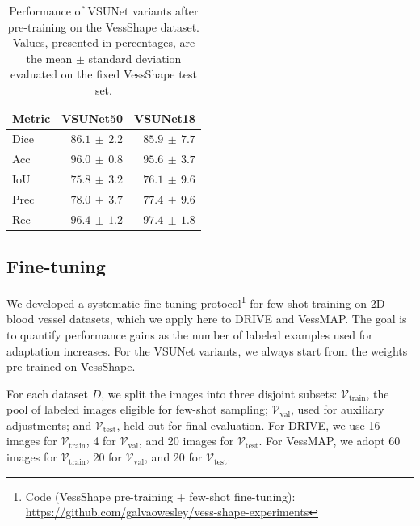 \documentclass[%
reprint,
nofootinbib,
 amsmath,amssymb,
aps,
superscriptaddress,
showkeys,
longbibliography
]{revtex4-1}
\begin{document}
\begin{table}[t]
    \caption{Performance of VSUNet variants after pre-training on the VessShape dataset. Values, presented in percentages, are the mean $\pm$ standard deviation evaluated on the fixed VessShape test set.}
    \label{tab:vessshape_results_percent}
    \centering
    \begingroup
    \small
    \setlength{\tabcolsep}{6pt}
    \renewcommand{\arraystretch}{1.15}
    \begin{tabular}{l r r}
        \hline
        	\textbf{Metric} & \textbf{VSUNet50} & \textbf{VSUNet18} \\
        \hline
        Dice & $86.1 \,\pm\, 2.2$ & $85.9 \,\pm\, 7.7$ \\
        Acc & $96.0 \,\pm\, 0.8$ & $95.6 \,\pm\, 3.7$ \\
        IoU & $75.8 \,\pm\, 3.2$ & $76.1 \,\pm\, 9.6$ \\
        Prec & $78.0 \,\pm\, 3.7$ & $77.4 \,\pm\, 9.6$ \\
        Rec & $96.4 \,\pm\, 1.2$ & $97.4 \,\pm\, 1.8$ \\
        \hline
    \end{tabular}
    \endgroup
\end{table}



\subsection{Fine-tuning}

We developed a systematic fine-tuning protocol\footnote{Code (VessShape pre-training + few-shot fine-tuning): \url{https://github.com/galvaowesley/vess-shape-experiments} } for few-shot training on 2D blood vessel datasets, which we apply here to DRIVE and VessMAP. The goal is to quantify performance gains as the number of labeled examples used for adaptation increases. For the VSUNet variants, we always start from the weights pre-trained on VessShape.

For each dataset $D$, we split the images into three disjoint subsets: $\mathcal{V}_{\text{train}}$, the pool of labeled images eligible for few-shot sampling; $\mathcal{V}_{\text{val}}$, used for auxiliary adjustments; and $\mathcal{V}_{\text{test}}$, held out for final evaluation. For DRIVE, we use 16 images for $\mathcal{V}_{\text{train}}$, 4 for $\mathcal{V}_{\text{val}}$, and 20 images for $\mathcal{V}_{\text{test}}$. For VessMAP, we adopt 60 images for $\mathcal{V}_{\text{train}}$, 20 for $\mathcal{V}_{\text{val}}$, and 20 for $\mathcal{V}_{\text{test}}$.
\end{document}
